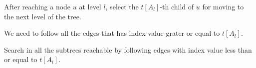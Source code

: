  After reaching a node $u$ at level $l$, select the $t[A_l]$-th child of $u$ for moving to the next level of the tree.


 We need to follow all the edges that has index value grater or equal to $t[A_l]$.


 Search in all the subtrees reachable by following edges with index value less than or equal to $t[A_l]$.